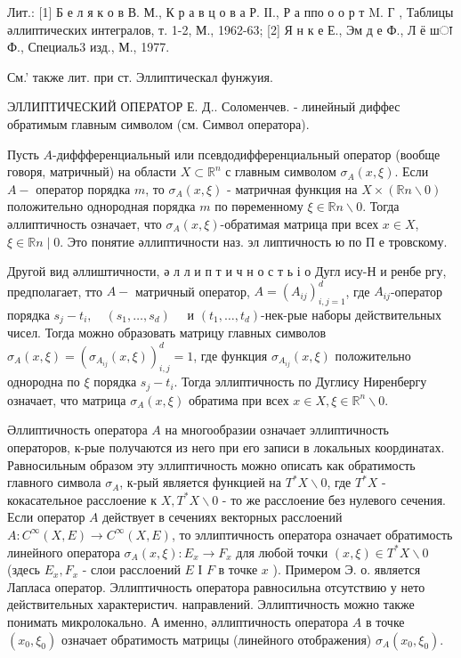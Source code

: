 \documentclass[10pt]{article}
\begin{document}
Лит.: [1] Б е л я к о в В. М., К р а в ц о в а Р. ІІ., Р а ппо о о р т M. Г , Таблицы әллиптических интегралов, т. 1-2, М., 1962-63; [2] Я н к е Е., Эм д е Ф., Л ё шा Ф., Специаль3 изд., М., 1977.



См.' также лит. при ст. Эллиптическал фунжуия.



ЭЛЛИПТИЧЕСКИЙ ОПЕРАТОР Е. Д.. Соломенчев. - линейный диффес обратимым главным символом (см. Символ оператора).



Пусть $A$-диффференциальный или псевдодифференциальный оператор (вообще говоря, матричный) на области $X \subset \mathbb{R}^{n}$ с главным символом $\sigma_{A}(x, \xi)$. Если $A-$ оператор порядка $m$, то $\sigma_{A}(x, \xi)$ - матричная функция на $X \times(\mathbb{R} n \backslash 0)$ положительно однородная порядка $m$ по пөременному $\xi \in \mathbb{R} n \backslash 0$. Тогда әллиптичность означает, что $\sigma_{A}(x, \xi)$-обратимая матрица при всех $x \in X$, $\xi \in \mathbb{R} n \mid 0$. Это понятие әллиптичности наз. эл липтичность ю по П е тровскому.



Другой вид әллиштичности, ә л л и п т и ч н о с т ь і о Дугл ису-Н и ренбе ргу, предполагает, тто $A-$ матричный оператор, $A=\left(A_{i j}\right)_{i, j=1}^{d}$, где $A_{i j}$-оператор порядка $s_{j}-t_{i}, \quad\left(s_{1}, \ldots, s_{d}\right) \quad$ и $\left(t_{1}, \ldots, t_{d}\right)$-нек-рые наборы действительных чисел. Тогда можно образовать матрицу главных символов $\sigma_{A}(x, \xi)=\left(\sigma_{A_{i j}}(x, \xi)\right)_{i, j}^{d}=1$, где функция $\sigma_{A_{i j}}(x, \xi)$ положительно однородна по $\xi$ порядка $s_{j}-t_{i}$. Тогда эллиптичность по Дуглису Ниренбергу означает, что матрица $\sigma_{A}(x, \xi)$ обратима при всех $x \in X, \xi \in \mathbb{R}^{n} \backslash 0$.



Әллиптичность оператора $A$ на многообразии означает эллиптичность операторов, к-рые получаются из него при его записи в локальных координатах. Равносильным образом эту эллиптичность можно описать как обратимость главного символа $\sigma_{A}$, к-рый является функцией на $T^{*} X \backslash 0$, где $T^{*} X$ - кокасательное расслоение к $X, T^{*} X \backslash 0$ - то же расслоение без нулевого сечения. Если оператор $A$ действует в сечениях векторных расслоений $A: C^{\infty}(X, E) \rightarrow C^{\infty}(X, E)$, то эллиптичность оператора означает обратимость линейного оператора $\sigma_{A}(x, \xi): E_{x} \rightarrow F_{x}$ для любой точки $(x, \xi) \in T^{*} X \backslash 0$ (здесь $E_{x}, F_{x}$ - слои расслоений $E$ І $F$ в точке $x$ ). Примером Э. о. является Лапласа оператор. Эллиптичность оператора равносильна отсутствию у нето действительных характеристич. направлений. Эллиптичность можно также понимать микролокально. А именно, әллиптичность оператора $A$ в точке $\left(x_{0}, \xi_{0}\right)$ означает обратимость матрицы (линейного отображения) $\sigma_{A}\left(x_{0}, \xi_{0}\right)$.
\end{document}
